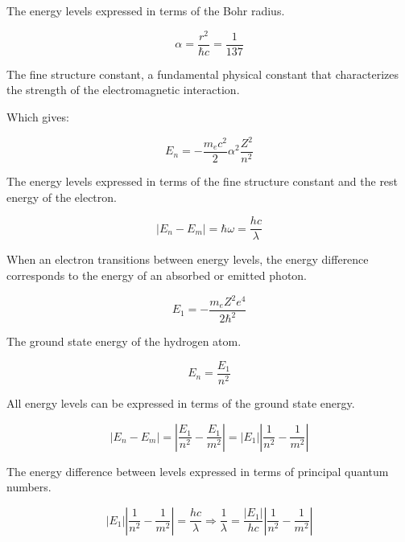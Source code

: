 The energy levels expressed in terms of the Bohr radius.

\begin{equation}
\alpha=\frac{r^{2}}{\hbar c}=\frac{1}{137}
\end{equation}

The fine structure constant, a fundamental physical constant that characterizes the strength of the electromagnetic interaction.

Which gives:

\begin{equation}
E_{n}=-\frac{m_{e} c^{2}}{2} \alpha^{2} \frac{Z^{2}}{n^{2}}
\end{equation}

The energy levels expressed in terms of the fine structure constant and the rest energy of the electron.

\begin{equation}
\left|E_{n}-E_{m}\right|=\hbar \omega=\frac{h c}{\lambda}
\end{equation}

When an electron transitions between energy levels, the energy difference corresponds to the energy of an absorbed or emitted photon.

\begin{equation}
E_{1}=-\frac{m_{e} Z^{2} e^{4}}{2 \hbar^{2}}
\end{equation}

The ground state energy of the hydrogen atom.

\begin{equation}
E_{n}=\frac{E_{1}}{n^{2}}
\end{equation}

All energy levels can be expressed in terms of the ground state energy.

\begin{equation}
\left|E_{n}-E_{m}\right|=\left|\frac{E_{1}}{n^{2}}-\frac{E_{1}}{m^{2}}\right|=\left|E_{1}\right|\left|\frac{1}{n^{2}}-\frac{1}{m^{2}}\right|
\end{equation}

The energy difference between levels expressed in terms of principal quantum numbers.

\begin{equation}
\left|E_{1}\right|\left|\frac{1}{n^{2}}-\frac{1}{m^{2}}\right|=\frac{h c}{\lambda} \Longrightarrow \frac{1}{\lambda}=\frac{\left|E_{1}\right|}{h c}\left|\frac{1}{n^{2}}-\frac{1}{m^{2}}\right|
\end{equation}


